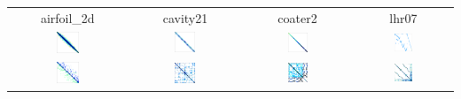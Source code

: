 \documentclass{article}
\begin{document}
\begin{table}[H]
\centering
\begin{tabular}{ c c c c }
  airfoil\_2d & cavity21 & coater2 & lhr07 \\
  \includegraphics[width=0.2\textwidth]{img/matrices/airfoil_2d.png} & \includegraphics[width=0.2\textwidth]{img/matrices/cavity21.png} & \includegraphics[width=0.2\textwidth]{img/matrices/coater2.png} & \includegraphics[width=0.2\textwidth]{img/matrices/lhr07.png} \\
  \includegraphics[width=0.2\textwidth]{img/matrices/cage10.png} & \includegraphics[width=0.2\textwidth]{img/matrices/ASIC_100ks.png} & \includegraphics[width=0.2\textwidth]{img/matrices/scircuit.png} & \includegraphics[width=0.2\textwidth]{img/matrices/hvdc1.png} \\

\end{tabular}
\end{table}
\end{document}
